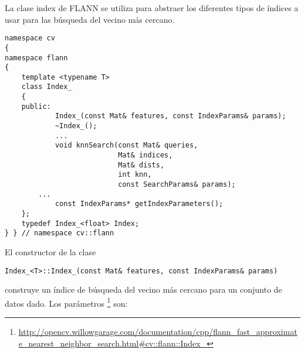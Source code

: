 \documentclass[a4paper,11pt,spanish]{article}
\begin{document}
La clase index de FLANN se utiliza para abstraer los diferentes tipos de índices a usar para las búsqueda del vecino más cercano.
\begin{lstlisting}
namespace cv
{
namespace flann
{
    template <typename T>
    class Index_
    {
    public:
            Index_(const Mat& features, const IndexParams& params);
            ~Index_();
            ...
            void knnSearch(const Mat& queries,
                           Mat& indices,
                           Mat& dists,
                           int knn,
                           const SearchParams& params);
	    ...
            const IndexParams* getIndexParameters();
    };
    typedef Index_<float> Index;
} } // namespace cv::flann
\end{lstlisting}
El constructor de la clase
\begin{lstlisting}
Index_<T>::Index_(const Mat& features, const IndexParams& params)
\end{lstlisting}
construye un índice de búsqueda del vecino más cercano para un conjunto de datos dado. Los parámetros
\footnote{ \url{http://opencv.willowgarage.com/documentation/cpp/flann_fast_approximate_nearest_neighbor_search.html#cv::flann::Index_} }
son:
\end{document}
